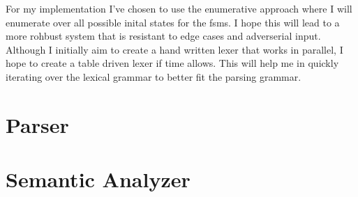 For my implementation I've chosen to use the enumerative approach where I will
enumerate over all possible inital states for the \glspl{fsm}. I hope  this will
lead to a more rohbust system that is resistant to edge cases and adverserial
input. Although I initially aim to create a hand written lexer that works in
parallel, I hope to create a table driven lexer if time allows. This will help
me in quickly iterating over the lexical grammar to better fit the parsing
grammar.

\section{Parser} \label{parser}

\section{Semantic Analyzer} \label{semantic_analyzer}
